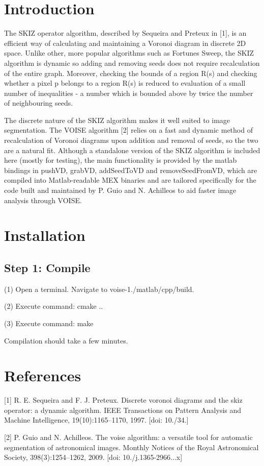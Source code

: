 \hypertarget{index_intro_sec}{}\section{Introduction}\label{index_intro_sec}
The S\+K\+IZ operator algorithm, described by Sequeira and Preteux in \mbox{[}1\mbox{]}, is an efficient way of calculating and maintaining a Voronoi diagram in discrete 2D space. Unlike other, more popular algorithms such as Fortune\textquotesingle{}s Sweep, the S\+K\+IZ algorithm is dynamic so adding and removing seeds does not require recalculation of the entire graph. Moreover, checking the bounds of a region R(s) and checking whether a pixel p belongs to a region R(s) is reduced to evaluation of a small number of inequalities -\/ a number which is bounded above by twice the number of neighbouring seeds.

The discrete nature of the S\+K\+IZ algorithm makes it well suited to image segmentation. The V\+O\+I\+SE algorithm \mbox{[}2\mbox{]} relies on a fast and dynamic method of recalculation of Voronoi diagrams upon addition and removal of seeds, so the two are a natural fit. Although a standalone version of the S\+K\+IZ algorithm is included here (mostly for testing), the main functionality is provided by the matlab bindings in push\+VD, grab\+VD, add\+Seed\+To\+VD and remove\+Seed\+From\+VD, which are compiled into Matlab-\/readable M\+EX binaries and are tailored specifically for the code built and maintained by P. Guio and N. Achilleos to aid faster image analysis through V\+O\+I\+SE.\hypertarget{index_install_sec}{}\section{Installation}\label{index_install_sec}
\hypertarget{index_step1}{}\subsection{Step 1\+: Compile}\label{index_step1}
(1) Open a terminal. Navigate to voise-\/1./matlab/cpp/build.

(2) Execute command\+: cmake ..

(3) Execute command\+: make

Compilation should take a few minutes.\hypertarget{index_references_sec}{}\section{References}\label{index_references_sec}
\mbox{[}1\mbox{]} R. E. Sequeira and F. J. Preteux. Discrete voronoi diagrams and the skiz operator\+: a dynamic algorithm. I\+E\+EE Transactions on Pattern Analysis and Machine Intelligence, 19(10)\+:1165–1170, 1997. \mbox{[}doi\+: 10./34.\mbox{]}

\mbox{[}2\mbox{]} P. Guio and N. Achilleos. The voise algorithm\+: a versatile tool for automatic segmentation of astronomical images. Monthly Notices of the Royal Astronomical Society, 398(3)\+:1254–1262, 2009. \mbox{[}doi\+: 10./j.1365-\/2966...\+x\mbox{]} 